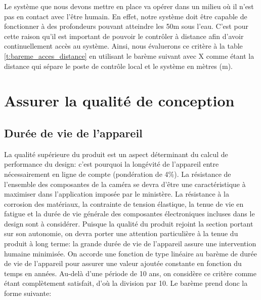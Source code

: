 \begin{table}
   \footnotesize
   \centering
   \caption{Évaluation du barème de l'accès à distance}
   \label{t:bareme_acces_distance}
\end{table}

Le système que nous devons mettre en place va opérer dans un milieu où il n’est pas en contact avec l’être humain. En effet, notre système doit être capable de fonctionner à des profondeurs pouvant atteindre les 50m sous l’eau. C'est pour cette raison qu'il est important de pouvoir le contrôler à distance afin d’avoir continuellement accès au système. Ainsi, nous évaluerons ce critère à la table \ref{t:bareme_acces_distance} en utilisant le barème suivant avec X comme étant la distance qui sépare le poste de contrôle local et le système en mètres (m).

\section{Assurer la qualité de conception}

\subsection{Durée de vie de l'appareil}

La qualité supérieure du produit est un aspect déterminant du calcul de performance du design: c'est pourquoi la longévité de l'appareil entre nécessairement en ligne de compte (pondération de 4\%). La résistance de l'ensemble des composantes de la caméra se devra d'être une caractéristique à maximiser dans l'application imposée par le ministère. La résistance à la corrosion des matériaux, la contrainte de tension élastique, la tenue de vie en fatigue et la durée de vie générale des composantes électroniques incluses dans le design sont à considérer. Puisque la qualité du produit rejoint la section portant sur son autonomie, on devra porter une attention particulière à la tenue du produit à long terme: la grande durée de vie de l'appareil assure une intervention humaine minimisée. On accorde une fonction de type linéaire au barème de durée de vie de l'appareil pour assurer une valeur ajoutée constante en fonction du temps en années. Au-delà d'une période de 10 ans, on considère ce critère comme étant complètement satisfait, d'où la division par 10. Le barème prend donc la forme suivante:

